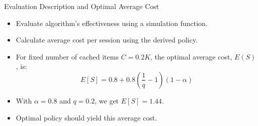 \documentclass{beamer}
\begin{document}
\begin{frame}{Evaluation Description and Optimal Average Cost}
    \begin{itemize}
        \item Evaluate algorithm's effectiveness using a simulation function.
        \item Calculate average cost per session using the derived policy.
        \item For fixed number of cached items $C=0.2K$, the optimal average cost, $E(S)$, is:
        \begin{equation*}
            E[S] = 0.8 + 0.8(\frac{1}{q}-1)(1-\alpha)
        \end{equation*}
        \item With $\alpha = 0.8$ and $q=0.2$, we get $E[S] = 1.44$.
        \item Optimal policy should yield this average cost.
    \end{itemize}
    \end{frame}
    
\end{document}

